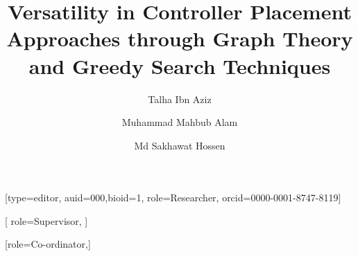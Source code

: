 \documentclass[a4paper,fleqn]{cas-dc}
\begin{document}
\sloppy	

\let\WriteBookmarks\relax
\def\floatpagepagefraction{1}
\def\textpagefraction{.001}

\title [mode = title]{Versatility in Controller Placement Approaches through Graph Theory and Greedy Search Techniques}





\author[1]{Talha Ibn Aziz}[type=editor,
                        auid=000,bioid=1,
                        role=Researcher,
                        orcid=0000-0001-8747-8119]
\cormark[1]


\address[1]{Department of Computing Science, University of Alberta}

\author[2]{Muhammad Mahbub Alam}[%
   role=Supervisor,
   ]


\author[2]{Md Sakhawat Hossen}[role=Co-ordinator,]

\address[2]{Department of Computer Science and Engineering, Islamic University of Technology}


\end{document}
